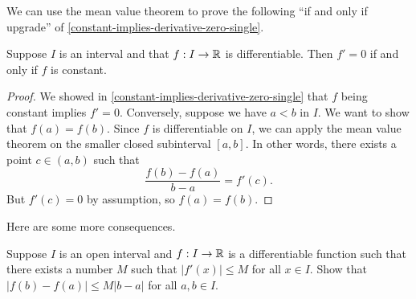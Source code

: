 We can use the mean value theorem to prove the following ``if and only if upgrade'' of \cref{constant-implies-derivative-zero-single}. 

\begin{proposition} \label{constant-iff-derivative-zero-single}
	Suppose $I$ is an interval and that $f : I \to \mathbb{R}$ is differentiable. Then $f' = 0$ if and only if $f$ is constant. 
\end{proposition}

\begin{proof}
	We showed in \cref{constant-implies-derivative-zero-single} that $f$ being constant implies $f' = 0$. Conversely, suppose we have $a < b$ in $I$. We want to show that $f(a) = f(b)$. Since $f$ is differentiable on $I$, we can apply the mean value theorem on the smaller closed subinterval $[a, b]$. In other words, there exists a point $c \in (a,b)$ such that
	\[ \frac{f(b)-f(a)}{b-a} = f'(c). \]
	But $f'(c) = 0$ by assumption, so $f(a) = f(b)$. 
\end{proof}

Here are some more consequences. 

\begin{exercise} \label{bounded-derivative}
	Suppose $I$ is an open interval and $f : I \to \mathbb{R}$ is a differentiable function such that there exists a number $M$ such that $|f'(x)| \leq M$ for all $x \in I$. Show that $|f(b) - f(a)| \leq M|b-a|$ for all $a, b \in I$.\footnotemark
\end{exercise}

